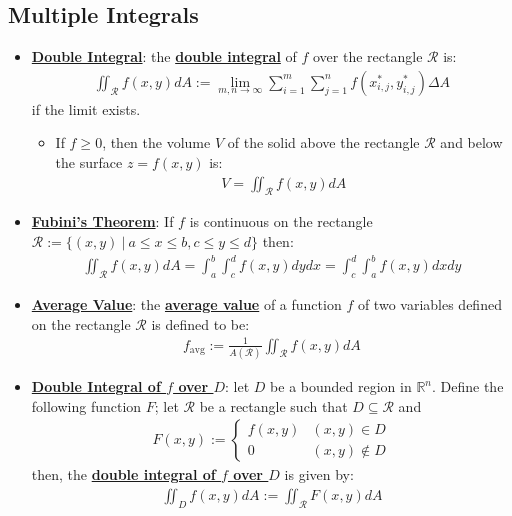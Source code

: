 \documentclass[reqno,11pt]{amsart}
\theoremstyle{definition}
\theoremstyle{remark}
\newcommand{\R}{\mathbb{R}}
\newcommand{\dfn}[1]{\underline{\textbf{#1}}}
\begin{document}
\subsection{Multiple Integrals}
\begin{itemize}
	\item \dfn{Double Integral}: the \dfn{double integral} of $f$ over the rectangle $\mathcal{R}$ is: 
	\begin{align}
		\iint_{\mathcal{R}} f(x,y) dA := \lim_{m,n \rightarrow \infty} \sum_{i=1}^m \sum_{j=1}^n f(x_{i,j}^*, y_{i,j}^*) \Delta A 	
	\end{align}
	if the limit exists.
	\begin{itemize}
		\item If $f \geq 0$, then the volume $V$ of the solid above the rectangle $\mathcal{R}$ and below the surface $z=f(x,y)$ is:
		\begin{align}
			V = \iint_{\mathcal{R}} f(x,y) dA	
		\end{align}
	\end{itemize}
	\item \dfn{Fubini's Theorem}: If $f$ is continuous on the rectangle $\mathcal{R} := \{ (x,y)\ |\ a \leq x \leq b, c \leq y \leq d \}$ then: 
	\begin{align}
		\iint_{\mathcal{R}} f(x,y) dA = \int_a^b \int_c^d f(x,y) dy dx = \int_c^d \int_a^b f(x,y) dx dy 	
	\end{align}
	\item \dfn{Average Value}: the \dfn{average value} of a function $f$ of two variables defined on the rectangle $\mathcal{R}$ is defined to be: 
	\begin{align}
		f_{\text{avg}} := \frac{1}{A(\mathcal{R})} \iint_{\mathcal{R}} f(x,y) dA 	
	\end{align}
	\item \dfn{Double Integral of $f$ over $D$}: let $D$ be a bounded region in $\R^n$. Define the following function $F$; let $\mathcal{R}$ be a rectangle such that $D \subseteq \mathcal{R}$ and 
	\begin{align}
		F(x,y) := \begin{cases}
			f(x,y) & (x,y) \in D \\
			0 	   & (x,y) \notin D 
		\end{cases}	
	\end{align}
		then, the \dfn{double integral of $f$ over $D$} is given by:
		\begin{align}
			\iint_{D} f(x,y) dA := \iint_{\mathcal{R}} F(x,y) dA 
	    \end{align}

\end{itemize}
\end{document}
